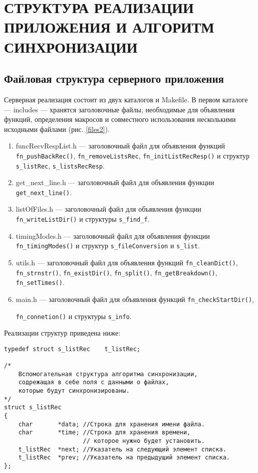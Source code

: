 \section{СТРУКТУРА РЕАЛИЗАЦИИ ПРИЛОЖЕНИЯ И АЛГОРИТМ СИНХРОНИЗАЦИИ}

\subsection{Файловая структура серверного приложения}

Серверная реализация состоит из двух каталогов и Makefile.
В первом каталоге --- includes --- хранятся заголовочные файлы, необходимые для объявления функций, определения макросов и совместного использования несколькими исходными файлами (рис. \ref{files2}).
\begin{enumerate}
	\item funcRecvRespList.h --- заголовочный файл для объявления функций 
		\verb|fn_pushBackRec()|, \verb|fn_removeListsRec|, \verb|fn_initListRecResp()| и структур \verb|s_listRec|, \verb|s_listsRecResp|.
	\item get\_next\_line.h --- заголовочный файл для объявления функции \verb|get_next_line()|.
	\item listOfFiles.h --- заголовочный файл для объявления функции \verb|fn_writeListDir()| и структуры \verb|s_find_f|.
	\item timingModes.h --- заголовочный файл для объявления функции \verb|fn_timingModes()| и структур \verb|s_fileConversion| и \verb|s_list|.
	\item utils.h --- заголовочный файл для объявления функций \verb|fn_cleanDict()|, \verb|fn_strnstr()|, \verb|fn_existDir()|, \verb|fn_split()|, \verb|fn_getBreakdown()|, \verb|fn_setTimes()|.
	\item main.h --- заголовочный файл для объявления функций \verb|fn_checkStartDir()|,
	
		\verb|fn_connetion()| и структуры \verb|s_info|.
\end{enumerate}
Реализации структур приведена ниже:
\begin{verbatim}
typedef struct s_listRec	t_listRec;

/*
	Вспомогательная структура алгоритма синхронизации,
	содрежащая в себе поля с данными о файлах,
	которые будут синхронизированы.
*/
struct s_listRec
{
    char       *data; //Строка для хранения имени файла.
    char       *time; //Строка для хранения времени,
                      // которое нужно будет установить.
    t_listRec  *next; //Указатель на следующий элемент списка.
    t_listRec  *prev; //Указатель на предыдущий элемент списка.
};
\end{verbatim}
